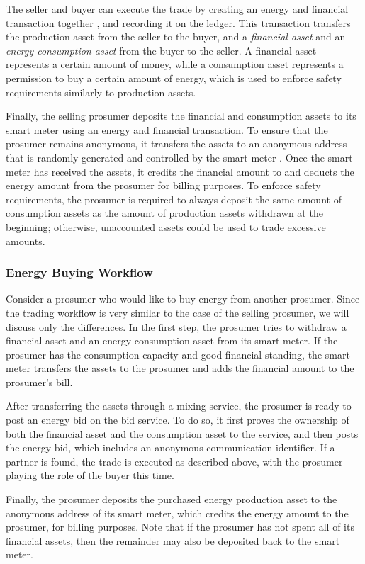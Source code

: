 The seller and buyer can execute the trade by creating an energy and
financial transaction together , and recording it on the
ledger.  This transaction transfers the production asset from the
seller to the buyer, and a \emph{financial asset} and an \emph{energy
  consumption asset} from the buyer to the seller.  A financial asset
represents a certain amount of money, while a consumption asset
represents a permission to buy a certain amount of energy, which is
used to enforce safety requirements similarly to production assets.

Finally, the selling prosumer deposits the financial and consumption
assets to its smart meter using an energy and financial transaction.
To ensure that the prosumer remains anonymous, it transfers the assets
to an anonymous address that is randomly generated and controlled by
the smart meter .  Once the smart meter has received the
assets, it credits the financial amount to and deducts the energy
amount from the prosumer for billing purposes.  To enforce safety
requirements, the prosumer is required to always deposit the same
amount of consumption assets as the amount of production assets
withdrawn at the beginning; otherwise, unaccounted assets could be
used to trade excessive amounts.

\subsubsection{Energy Buying Workflow}
Consider a prosumer who would like to buy energy from another
prosumer.  Since the trading workflow is very similar to the case of
the selling prosumer, we will discuss only the differences.  In the
first step, the prosumer tries to withdraw a financial asset and an
energy consumption asset from its smart meter.  If the prosumer has
the consumption capacity and good financial standing, the smart meter
transfers the assets to the prosumer and adds the financial amount to
the prosumer's bill.

After transferring the assets through a mixing service, the prosumer
is ready to post an energy bid on the bid service.  To do so, it first
proves the ownership of both the financial asset and the consumption
asset to the service, and then posts the energy bid, which includes an
anonymous communication identifier.  If a partner is found, the trade
is executed as described above, with the prosumer playing the role of
the buyer this time.

Finally, the prosumer deposits the purchased energy production asset
to the anonymous address of its smart meter, which credits the energy
amount to the prosumer, for billing purposes.  Note that if the
prosumer has not spent all of its financial assets, then the remainder
may also be deposited back to the smart meter.





